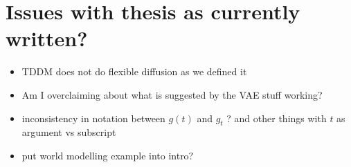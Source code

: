 \section*{Issues with thesis as currently written?}

\begin{itemize}
    \item TDDM does not do flexible diffusion as we defined it
    \item Am I overclaiming about what is suggested by the VAE stuff working?
    \item inconsistency in notation between $g(t)$ and $g_t$ ? and other things with $t$ as argument vs subscript
    \item put world modelling example into intro?
\end{itemize}

